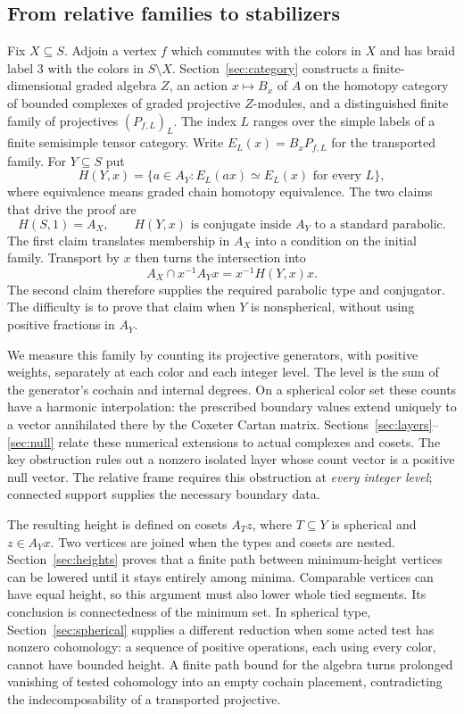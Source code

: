 \subsection{From relative families to stabilizers}

Fix $X\subseteq S$. Adjoin a vertex $f$ which commutes with the colors in
$X$ and has braid label $3$ with the colors in $S\setminus X$.
Section~\ref{sec:category} constructs a finite-dimensional graded
algebra $Z$, an action $x\mapsto B_x$ of $A$ on the homotopy category
of bounded complexes of graded projective $Z$-modules, and a distinguished finite family of
projectives $(P_{f,L})_L$.  The index $L$ ranges over the simple labels
of a finite semisimple tensor category.  Write
$E_L(x)=B_xP_{f,L}$ for the transported family.
For $Y\subseteq S$ put
\[
 H(Y,x)=\{a\in A_Y:E_L(ax)\simeq E_L(x)\text{ for every }L\},
\]
where equivalence means graded chain homotopy equivalence. The two
claims that drive the proof are
\[
 H(S,1)=A_X,
 \qquad
 H(Y,x)\text{ is conjugate inside }A_Y\text{ to a standard parabolic}.
\]
The first claim translates membership in $A_X$ into a condition on the
initial family.  Transport by $x$ then turns the intersection into
\[
 A_X\cap x^{-1}A_Yx=x^{-1}H(Y,x)x.
\]
The second claim therefore supplies the required parabolic type and
conjugator.  The difficulty is to prove that claim when $Y$ is
nonspherical, without using positive fractions in $A_Y$.

We measure this family by counting its projective generators, with
positive weights, separately at each color and each integer level.
The level is the sum of the generator's cochain and internal degrees.
On a spherical color set these counts have a harmonic interpolation:
the prescribed boundary values extend uniquely to a vector annihilated
there by the Coxeter Cartan matrix.  Sections~\ref{sec:layers}--\ref{sec:null}
relate these numerical extensions to actual complexes and cosets.
The key obstruction rules out a nonzero isolated layer whose count
vector is a positive null vector.  The relative frame requires this
obstruction at \emph{every integer level}; connected support supplies
the necessary boundary data.

The resulting height is defined on cosets $A_Tz$, where $T\subseteq Y$
is spherical and $z\in A_Yx$.  Two vertices are joined when the types
and cosets are nested.  Section~\ref{sec:heights} proves that a finite
path between minimum-height vertices can be lowered until it stays
entirely among minima.  Comparable vertices can have equal height,
so this argument must also lower whole tied segments.  Its conclusion
is connectedness of the minimum set.  In spherical type,
Section~\ref{sec:spherical} supplies a different reduction when some
acted test has nonzero cohomology: a sequence of positive operations,
each using every color, cannot have bounded height.
A finite path bound for the algebra turns prolonged vanishing of
tested cohomology into an empty cochain placement, contradicting the
indecomposability of a transported projective.


